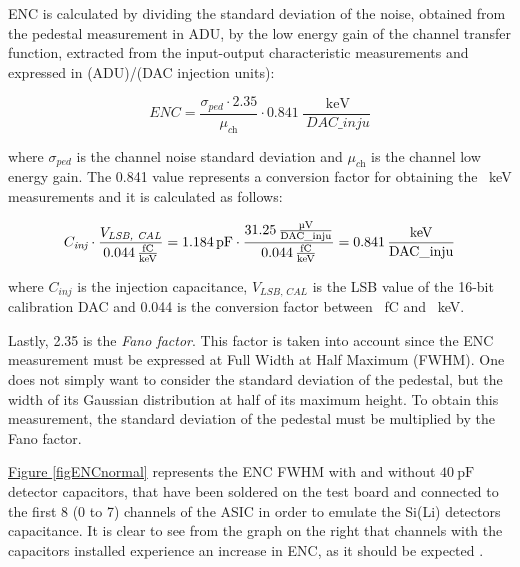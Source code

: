 \par
ENC is calculated by dividing the standard deviation of the noise, obtained from the pedestal measurement in ADU, by the low energy gain of the channel transfer function, extracted from the input-output characteristic measurements and expressed in (ADU)/(DAC injection units):

\begin{equation}
    ENC = \frac{\sigma_{\textit{ped}} \cdot 2.35}{\mu_{\textit{ch}}} \cdot \SI{0.841}{\frac{\SI{}{\kilo\electronvolt}}{\SI{}{DAC\_inju}}} 
\end{equation}

\noindent
where $\sigma_{\textit{ped}}$ is the channel noise standard deviation and $\mu_{\textit{ch}}$ is the channel low energy gain. The \SI{0.841}{} value represents a conversion factor for obtaining the \SI{}{\kilo\electronvolt} measurements and it is calculated as follows:

\begin{equation}
    C_{\textit{inj}} \cdot \frac{V_{\textit{LSB, CAL}}}{\SI{0.044}{\frac{fC}{\kilo\electronvolt}}} = \SI{1.184}{\pico\farad} \cdot \frac{\SI{31.25}{\frac{\micro\volt}{DAC\_inju}}}{\SI{0.044}{\frac{fC}{\kilo\electronvolt}}} = \SI{0.841}{\frac{\kilo\electronvolt}{DAC\_inju}}
    \label{eqConversionFactor}
\end{equation}

\noindent
where $C_{\textit{inj}}$ is the injection capacitance, $V_{\textit{LSB, CAL}}$ is the LSB value of the 16-bit calibration DAC and \SI{0.044}{} is the conversion factor between \SI{}{fC} and \SI{}{\kilo\electronvolt}.

\par
Lastly, 2.35 is the \textit{Fano factor}. This factor is taken into account since the ENC measurement must be expressed at Full Width at Half Maximum (FWHM). One does not simply want to consider the standard deviation of the pedestal, but the width of its Gaussian distribution at half of its maximum height. To obtain this measurement, the standard deviation of the pedestal must be multiplied by the Fano factor.

\par
\hyperref[figENCnormal]{Figure \ref{figENCnormal}} represents the ENC FWHM with and without $\SI{40}{\pico\farad}$ detector capacitors, that have been soldered on the test board and connected to the first 8 (0 to 7) channels of the ASIC in order to emulate the Si(Li) detectors capacitance. It is clear to see from the graph on the right that channels with the capacitors installed experience an increase in ENC, as it should be expected \cite{iakovidis_2018_vmm}.

